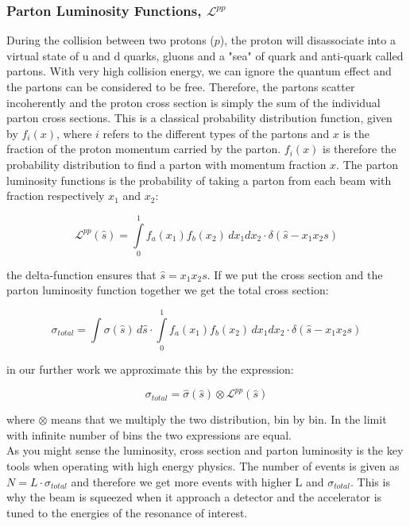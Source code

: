 \subsubsection{Parton Luminosity Functions, $\mathcal{L}^{pp}$}
During the collision between two protons ($p$), the proton will disassociate into a virtual state of u and d quarks, gluons and a "sea" of quark and anti-quark called partons. With very high collision energy, we can ignore the quantum effect and the partons can be considered to be free. Therefore, the partons scatter incoherently and the proton cross section is simply the sum of the individual parton cross sections. This is a classical probability distribution function, given by $f_{i}(x)$, where $i$ refers to the different types of the partons and $x$ is the fraction of the proton momentum carried by the parton\cite{green2005hpp}. $f_{i}(x)$ is therefore the probability distribution to find a parton with momentum fraction $x$. The parton luminosity functions is the probability of taking a parton from each beam with fraction respectively $x_{1}$ and $x_{2}$:

\begin{equation}
\mathcal{L}^{pp}(\hat s)=\int\limits_{0}^{1} f_{a}(x_{1}) f_{b}(x_{2})\, dx_{1}dx_{2}\cdot \delta(\hat s - x_{1}x_{2}s)
\end{equation}

the delta-function ensures that $\hat s = x_{1}x_{2}s$. If we put the cross section and the parton luminosity function together we get the total cross section:

\begin{equation}
\sigma_{total}=\int \sigma(\hat s) \, d \hat s \cdot \int\limits_{0}^{1} f_{a}(x_{1}) f_{b}(x_{2})\, dx_{1}dx_{2} \cdot \delta(\hat s - x_{1}x_{2}s)
\end{equation}

in our further work we approximate this by the expression:

\begin{equation}
\sigma_{total}= \hat \sigma(\hat s) \otimes  \mathcal{L}^{pp}(\hat s)
\end{equation}

where $\otimes$ means that we multiply the two distribution, bin by bin. In the limit with infinite number of bins the two expressions are equal. \\

As you might sense the luminosity, cross section and parton luminosity is the key tools when operating with high energy physics. The number of events is given as $N=L\cdot\sigma_{total}$ and therefore we get more events with higher L and $\sigma_{total}$. This is why the beam is squeezed when it approach a detector and the accelerator is tuned to the energies of the resonance of interest.

